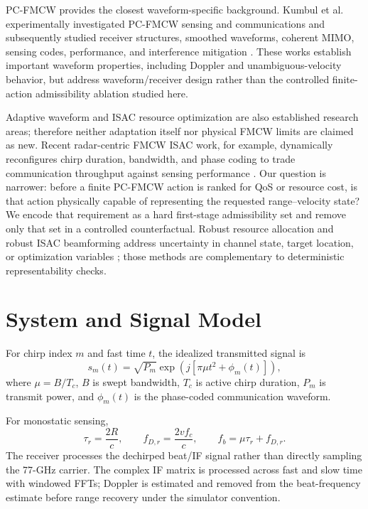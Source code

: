 \documentclass[conference,a4paper]{IEEEtran}
\begin{document}
PC-FMCW provides the closest waveform-specific background. Kumbul et al. experimentally investigated PC-FMCW sensing and communications and subsequently studied receiver structures, smoothed waveforms, coherent MIMO, sensing codes, performance, and interference mitigation \cite{kumbul2021experimental,kumbul2022receiver,kumbul2022smoothed,kumbul2022codes,kumbul2023mimo,kumbul2023performance,kumbul2024interference}. These works establish important waveform properties, including Doppler and unambiguous-velocity behavior, but address waveform/receiver design rather than the controlled finite-action admissibility ablation studied here.

Adaptive waveform and ISAC resource optimization are also established research areas; therefore neither adaptation itself nor physical FMCW limits are claimed as new. Recent radar-centric FMCW ISAC work, for example, dynamically reconfigures chirp duration, bandwidth, and phase coding to trade communication throughput against sensing performance \cite{temiz2026adaptive}. Our question is narrower: before a finite PC-FMCW action is ranked for QoS or resource cost, is that action physically capable of representing the requested range--velocity state? We encode that requirement as a hard first-stage admissibility set and remove only that set in a controlled counterfactual. Robust resource allocation and robust ISAC beamforming address uncertainty in channel state, target location, or optimization variables \cite{wu2021robustv2x,lyu2024dualrobust}; those methods are complementary to deterministic representability checks.

\section{System and Signal Model}
For chirp index $m$ and fast time $t$, the idealized transmitted signal is
\begin{equation}
s_m(t)=\sqrt{P_m}\exp\left(j[\pi\mu t^2+\phi_m(t)]\right),
\end{equation}
where $\mu=B/T_c$, $B$ is swept bandwidth, $T_c$ is active chirp duration, $P_m$ is transmit power, and $\phi_m(t)$ is the phase-coded communication waveform.

For monostatic sensing,
\begin{equation}
\tau_r=\frac{2R}{c},\qquad f_{D,r}=\frac{2vf_c}{c},\qquad f_b=\mu\tau_r+f_{D,r}.
\end{equation}
The receiver processes the dechirped beat/IF signal rather than directly sampling the 77-GHz carrier. The complex IF matrix is processed across fast and slow time with windowed FFTs; Doppler is estimated and removed from the beat-frequency estimate before range recovery under the simulator convention.
\end{document}
